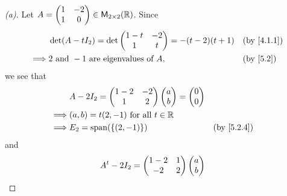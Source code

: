 \begin{proof}[(a)]
	Let \(A = \begin{pmatrix}
		1 & -2 \\
		1 & 0
	\end{pmatrix} \in \mathsf{M}_{{2} \times 2}({\mathbb{R}})\).
	Since
	\begin{align*}
		         & \det(A - t I_2) = \det\begin{pmatrix}
			                                 1 - t & -2 \\
			                                 1     & t
		                                 \end{pmatrix} = -(t - 2)(t + 1)            &  & \by{4.1.1} \\
		\implies & 2 \text{ and } -1 \text{ are eigenvalues of } A, &  & \by{5.2}
	\end{align*}
	we see that
	\begin{align*}
		         & A - 2I_2 = \begin{pmatrix}
			                      1 - 2 & -2 \\
			                      1     & 2
		                      \end{pmatrix} \begin{pmatrix}
			                                    a \\
			                                    b
		                                    \end{pmatrix} = \begin{pmatrix}
			                                                    0 \\
			                                                    0
		                                                    \end{pmatrix}     \\
		\implies & (a, b) = t(2, -1) \text{ for all } t \in \R                 \\
		\implies & E_2 = \spn{\set{(2, -1)}}                   &  & \by{5.2.4}
	\end{align*}
	and
	\begin{align*}
		         & {A}^{t} - 2I_2 = \begin{pmatrix}
			                           1 - 2 & 1 \\
			                           -2    & 2
		                           \end{pmatrix} \begin{pmatrix}
			                                         a \\
			                                         b

\end{pmatrix}
\end{align*}
\end{proof}
